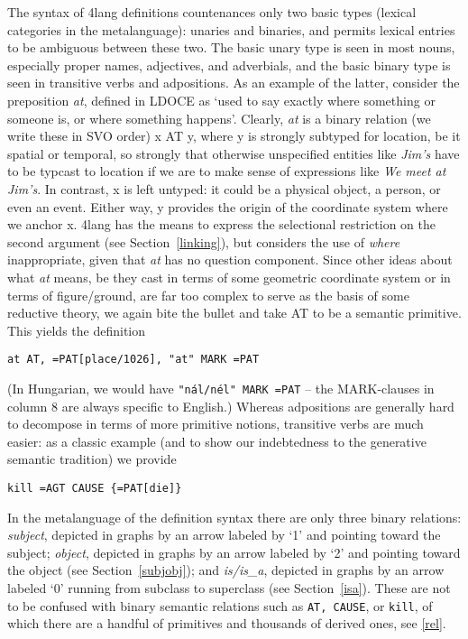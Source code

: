 \documentclass[11pt,bookmarks,bookmarksnumbered,naturalnames,plainpages=false,pdftex,colorlinks=true,urlcolor=blue,bookmarksdepth=subsection,plainpages=false]{paper}
\begin{document}
The syntax of 4lang definitions countenances only two basic types (lexical
categories in the metalanguage): unaries and binaries, and permits lexical
entries to be ambiguous between these two.  The basic unary type is seen in
most nouns, especially proper names, adjectives, and adverbials, and the basic
binary type is seen in transitive verbs and adpositions.  As an example of the
latter, consider the preposition {\it at}, defined in LDOCE as `used to say
exactly where something or someone is, or where something happens'. Clearly,
{\it at} is a binary relation (we write these in SVO order) x AT y, where y is
strongly subtyped for location, be it spatial or temporal, so strongly that
otherwise unspecified entities like {\it Jim's} have to be typcast to location
if we are to make sense of expressions like {\it We meet at Jim's}. In
contrast, x is left untyped: it could be a physical object, a person, or even
an event. Either way, y provides the origin of the coordinate system where we
anchor x. 4lang has the means to express the selectional restriction on the
second argument (see Section~\ref{linking}), but considers the use of {\it
  where} inappropriate, given that {\it at} has no question component. %
Since other ideas about what
{\it at} means, be they cast in terms of some geometric coordinate system or
in terms of figure/ground, are far too complex to serve as the basis of some
reductive theory, we again bite the bullet and take AT to be a semantic
primitive. This yields the definition

\begin{verbatim}
at AT, =PAT[place/1026], "at" MARK =PAT
\end{verbatim}

\noindent
(In Hungarian, we would have {\tt "n\'al/n\'el" MARK =PAT} -- the MARK-clauses
in column 8 are always specific to English.) Whereas adpositions are generally
hard to decompose in terms of more primitive notions, transitive verbs are
much easier: as a classic example (and to show our indebtedness to the
generative semantic tradition) we provide

\begin{verbatim}
kill =AGT CAUSE {=PAT[die]} 
\end{verbatim}

\noindent
In the metalanguage of the definition syntax there are only three binary
relations: {\it subject}, depicted in graphs by an arrow labeled by `1' and
pointing toward the subject; {\it object}, depicted in graphs by an arrow
labeled by `2' and pointing toward the object (see Section~\ref{subjobj}); and
{\it is/is\_a}, depicted in graphs by an arrow labeled `0' running from
subclass to superclass (see Section~\ref{isa}). These are not to be confused
with binary semantic relations such as {\tt AT, CAUSE}, or {\tt kill}, of which
there are a handful of primitives and thousands of derived ones, see \ref{rel}.
\end{document}
